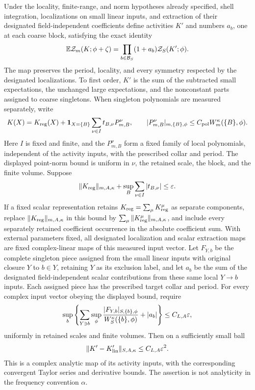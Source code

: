 \begin{proposition}\label{rg:partition-map}
Under the locality, finite-range, and norm hypotheses already specified, shell integration, localizations on small linear inputs, and extraction of their designated field-independent coefficients define activities $K'$ and numbers $a_b$, one at each coarse block, satisfying the exact identity
\begin{equation}\label{rg:exact-map}
 \mathbb E\mathcal Z_m(K;\phi+\zeta)
 =\prod_{b\in\mathcal B_S}(1+a_b)\mathcal Z_S(K';\phi).
\end{equation}
The map preserves the period, locality, and every symmetry respected by the designated localizations.  To first order, $K'$ is the sum of the subtracted small expectations, the unchanged large expectations, and the nonconstant parts assigned to coarse singletons.  When singleton polynomials are measured separately, write
\[
 K(X)=K_{\rm reg}(X)+\mathbf 1_{X=\{B\}}\sum_{\nu\in I}t_{B,\nu}P^\nu_{m,B},
 \qquad
 |P^\nu_{m,B}|_{m,\{B\},\phi}\le C_{\rm pol}W_m^\kappa(\{B\},\phi).
\]
Here $I$ is fixed and finite, and the $P^\nu_{m,B}$ form a fixed family of local polynomials, independent of the activity inputs, with the prescribed collar and period.  The displayed point-norm bound is uniform in $\nu$, the retained scale, the block, and the finite volume.  Suppose
\[
 \|K_{\rm reg}\|_{m,A,\kappa}
       +\sup_B\sum_{\nu\in I}|t_{B,\nu}|\le\varepsilon.
\]
If a fixed scalar representation retains $K_{\rm reg}=\sum_\mu K_{\rm reg}^\mu$ as separate components, replace $\|K_{\rm reg}\|_{m,A,\kappa}$ in this bound by $\sum_\mu\|K_{\rm reg}^\mu\|_{m,A,\kappa}$, and include every separately retained coefficient occurrence in the absolute coefficient sum.  With external parameters fixed, all designated localization and scalar extraction maps are fixed complex-linear maps of this measured input vector.  Let $F_{Y,b}$ be the complete singleton piece assigned from the small linear inputs with original closure $Y$ to $b\in Y$, retaining $Y$ as its exclusion label, and let $a_b$ be the sum of the designated field-independent scalar contributions from these same local $Y\to b$ inputs.  Each assigned piece has the prescribed target collar and period.  For every complex input vector obeying the displayed bound, require
\[
 \sup_b\left\{
 \sum_{Y\ni b}\sup_\phi
 \frac{|F_{Y,b}|_{S,\{b\},\phi}}{W_S^\kappa(\{b\},\phi)}
       +|a_b|\right\}\le C_{L,A}\varepsilon,
\]
uniformly in retained scales and finite volumes.
Then on a sufficiently small ball
\begin{equation}\label{rg:nonlinear-map}
 \|K'-K'_{\rm lin}\|_{S,A,\kappa}\le C_{L,A}\varepsilon^2.
\end{equation}
This is a complex analytic map of its activity inputs, with the corresponding convergent Taylor series and derivative bounds.  The assertion is not analyticity in the frequency convention $\alpha$.


\end{proposition}
